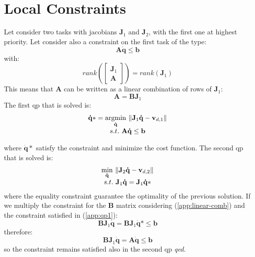 \section{Local Constraints}
\label{app:local-constr}

Let consider two tasks with jacobians $\mathbf{J}_1$ and $\mathbf{J}_2$, with the first one at highest priority. Let consider also a constraint on the first task of the type:
\begin{equation}
\mathbf{A}\mathbf{\dot{q}} \leq \mathbf{b}
\end{equation}
with:
\begin{equation}
rank\left ( \begin{bmatrix}
\mathbf{J}_1\\ 
\mathbf{A}
\end{bmatrix} \right ) = rank \left( \mathbf{J}_1 \right)
\end{equation}
This means that $\mathbf{A}$ can be written as a linear combination of rows of $\mathbf{J}_1$:
\begin{equation}
\label{app:linear-comb}
\mathbf{A} = \mathbf{BJ}_1
\end{equation}
The first qp that is solved is:
\begin{equation} 
\label{app:qp1}
\begin{array}{c}
\mathbf{\dot{q}}* = \underset{\mathbf{\dot{q}}}{\operatorname{argmin}} \ \Arrowvert \mathbf{J}_1 \mathbf{\dot{q}}-\mathbf{v}_{d,1} \Arrowvert\\
s.t. \ \mathbf{A}\mathbf{\dot{q}} \leq \mathbf{b}
\end{array}
\end{equation}

where $\mathbf{\dot{q}}*$ satisfy the constraint and minimize the cost function. 
The second qp that is solved is:
\begin{equation} 
\label{app:qp2}
\begin{array}{c}
\underset{\mathbf{\dot{q}}}{\operatorname{min}} \ \Arrowvert \mathbf{J}_2 \mathbf{\dot{q}}-\mathbf{v}_{d,2} \Arrowvert\\
s.t. \ \mathbf{J}_1\mathbf{\dot{q}} = \mathbf{J}_1\mathbf{\dot{q}}*
\end{array}
\end{equation}
where the equality constraint guarantee the optimality of the previous solution. If we multiply the constraint for the $\mathbf{B}$ matrix considering (\ref{app:linear-comb}) and the constraint satisfied in (\ref{app:qp1}):
\begin{equation}
\mathbf{B}\mathbf{J}_1\mathbf{\dot{q}} = \mathbf{B}\mathbf{J}_1\mathbf{\dot{q}}* \leq \mathbf{b}
\end{equation}
therefore:
\begin{equation}
\mathbf{B}\mathbf{J}_1\mathbf{\dot{q}} = \mathbf{A}\mathbf{\dot{q}}\leq \mathbf{b}
\end{equation}
so the constraint remains satisfied also in the second qp \emph{qed}.

